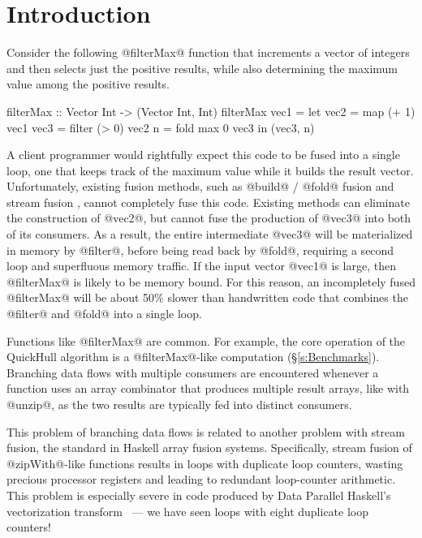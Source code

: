 \section{Introduction}
\label{s:Introduction}
Consider the following @filterMax@ function that increments a vector of integers and then selects just the positive results, while also determining the maximum value among the positive results. 
%
\begin{code}
  filterMax :: Vector Int -> (Vector Int, Int)
  filterMax vec1
   = let vec2    = map    (+ 1) vec1
         vec3    = filter (> 0) vec2
         n       = fold max 0 vec3
     in  (vec3, n)
\end{code}
%
A client programmer would rightfully expect this code to be fused into a single loop, one that keeps track of the maximum value while it builds the result vector. Unfortunately, existing fusion methods, such as @build@ / @fold@ fusion \cite{Gill:short-cut} and stream fusion \cite{Coutts:stream-fusion}, cannot completely fuse this code. Existing methods can eliminate the construction of @vec2@, but cannot fuse the production of @vec3@ into both of its consumers.  As a result, the entire intermediate @vec3@ will be materialized in memory by @filter@, before being read back by @fold@, requiring a second loop and superfluous memory traffic. If the input vector @vec1@ is large, then @filterMax@ is likely to be memory bound. For this reason, an incompletely fused @filterMax@ will be about 50\% slower than handwritten code that combines the @filter@ and @fold@ into a single loop.

Functions like @filterMax@ are common. For example, the core operation of the QuickHull algorithm is a @filterMax@-like computation (\S\ref{s:Benchmarks}). Branching data flows with multiple consumers are encountered whenever a function uses an array combinator that produces multiple result arrays, like with @unzip@, as the two results are typically fed into distinct consumers.

This problem of branching data flows is related to another problem with stream fusion, the standard in Haskell array fusion systems. Specifically, stream fusion of @zipWith@-like functions results in loops with duplicate loop counters, wasting precious processor registers and leading to redundant loop-counter arithmetic. This problem is especially severe in code produced by Data Parallel Haskell's vectorization transform~\cite{PeytonJones:harnessing-the-multicores} --- we have seen loops with eight duplicate loop counters! 

